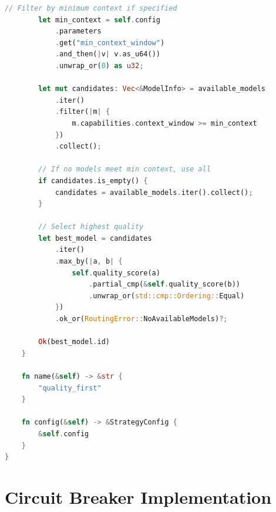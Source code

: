 \documentclass[12pt,a4paper,twoside]{report}
\begin{document}
\begin{lstlisting}[language=Rust,caption={Quality-First Routing - crates/gaussmeridian-router/src/strategies/quality.rs}]
        // Filter by minimum context if specified
        let min_context = self.config
            .parameters
            .get("min_context_window")
            .and_then(|v| v.as_u64())
            .unwrap_or(0) as u32;
        
        let mut candidates: Vec<&ModelInfo> = available_models
            .iter()
            .filter(|m| {
                m.capabilities.context_window >= min_context
            })
            .collect();
        
        // If no models meet min context, use all
        if candidates.is_empty() {
            candidates = available_models.iter().collect();
        }
        
        // Select highest quality
        let best_model = candidates
            .iter()
            .max_by(|a, b| {
                self.quality_score(a)
                    .partial_cmp(&self.quality_score(b))
                    .unwrap_or(std::cmp::Ordering::Equal)
            })
            .ok_or(RoutingError::NoAvailableModels)?;
        
        Ok(best_model.id)
    }
    
    fn name(&self) -> &str {
        "quality_first"
    }
    
    fn config(&self) -> &StrategyConfig {
        &self.config
    }
}
\end{lstlisting}

\section{Circuit Breaker Implementation}
\end{document}
